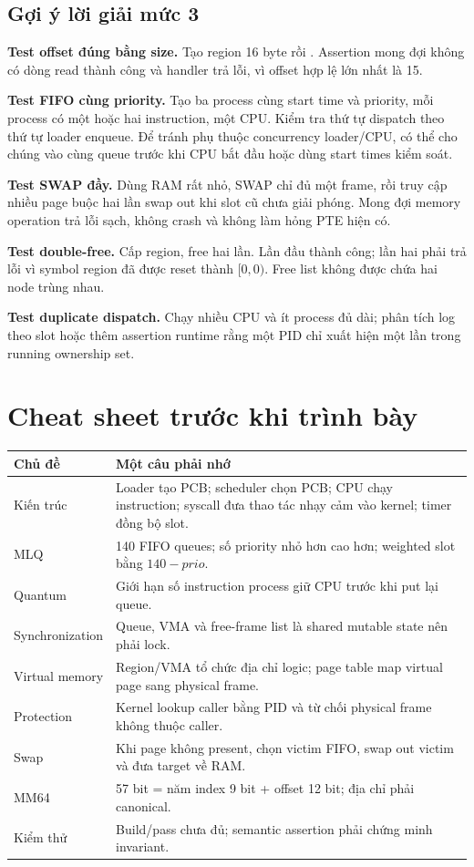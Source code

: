 \documentclass[12pt,a4paper]{article}
\newcommand{\code}[1]{\texttt{\detokenize{#1}}}
\begin{document}
\subsection{Gợi ý lời giải mức 3}

\textbf{Test offset đúng bằng size.} Tạo region 16 byte rồi
\code{read region 16 dst}. Assertion mong đợi không có dòng read thành công
và handler trả lỗi, vì offset hợp lệ lớn nhất là 15.

\textbf{Test FIFO cùng priority.} Tạo ba process cùng start time và priority,
mỗi process có một hoặc hai instruction, một CPU. Kiểm tra thứ tự dispatch
theo thứ tự loader enqueue. Để tránh phụ thuộc concurrency loader/CPU, có thể
cho chúng vào cùng queue trước khi CPU bắt đầu hoặc dùng start times kiểm soát.

\textbf{Test SWAP đầy.} Dùng RAM rất nhỏ, SWAP chỉ đủ một frame, rồi truy cập
nhiều page buộc hai lần swap out khi slot cũ chưa giải phóng. Mong đợi memory
operation trả lỗi sạch, không crash và không làm hỏng PTE hiện có.

\textbf{Test double-free.} Cấp region, free hai lần. Lần đầu thành công; lần
hai phải trả lỗi vì symbol region đã được reset thành \([0,0)\). Free list
không được chứa hai node trùng nhau.

\textbf{Test duplicate dispatch.} Chạy nhiều CPU và ít process đủ dài; phân
tích log theo slot hoặc thêm assertion runtime rằng một PID chỉ xuất hiện một
lần trong running ownership set.

\section{Cheat sheet trước khi trình bày}

\begin{longtable}{|p{4cm}|p{10cm}|}
\hline
\textbf{Chủ đề} & \textbf{Một câu phải nhớ}\\ \hline
Kiến trúc & Loader tạo PCB; scheduler chọn PCB; CPU chạy instruction; syscall
đưa thao tác nhạy cảm vào kernel; timer đồng bộ slot.\\ \hline
MLQ & 140 FIFO queues; số priority nhỏ hơn cao hơn; weighted slot bằng
\(140-prio\).\\ \hline
Quantum & Giới hạn số instruction process giữ CPU trước khi put lại queue.\\ \hline
Synchronization & Queue, VMA và free-frame list là shared mutable state nên
phải lock.\\ \hline
Virtual memory & Region/VMA tổ chức địa chỉ logic; page table map virtual page
sang physical frame.\\ \hline
Protection & Kernel lookup caller bằng PID và từ chối physical frame không
thuộc caller.\\ \hline
Swap & Khi page không present, chọn victim FIFO, swap out victim và đưa target
về RAM.\\ \hline
MM64 & 57 bit = năm index 9 bit + offset 12 bit; địa chỉ phải canonical.\\ \hline
Kiểm thử & Build/pass chưa đủ; semantic assertion phải chứng minh invariant.\\ \hline
\end{longtable}
\end{document}
